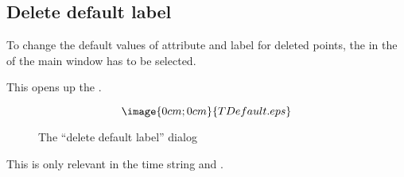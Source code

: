 \subsection{Delete default label}%
\label{timestring.default}
To change the default values of attribute and label 
for deleted points, the  in
the  of the main window has to be selected.

This opens up the 
.
\begin{figure}[h]
$$\image{0cm;0cm}{TDefault.eps}$$%
\caption{The ``delete default label'' dialog}%
\label{timestring.default.dialog}
\end{figure}

This is only relevant in the time string 
 and 
.

